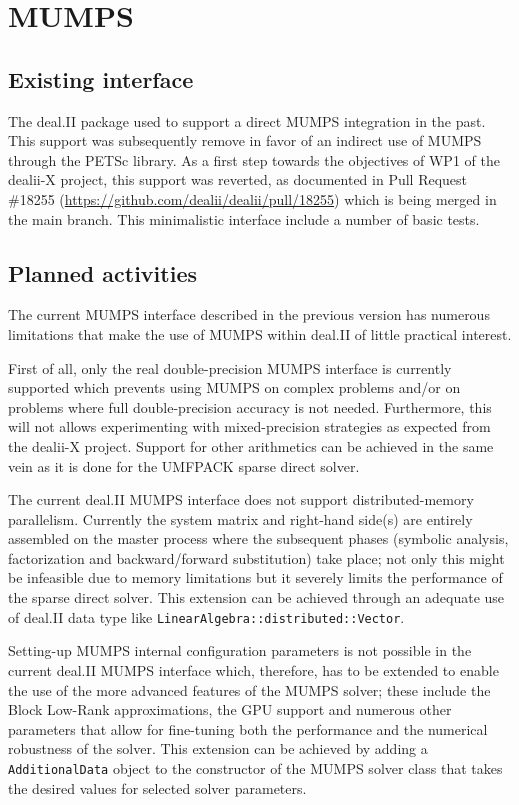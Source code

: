 \documentclass[a4paper,12pt]{article}
\begin{document}
\newpage

\section{MUMPS}
\label{sec:section2}

\subsection{Existing interface}

The deal.II package used to support a direct MUMPS integration in the
past. This support was subsequently remove in favor of an indirect use
of MUMPS through the PETSc library. As a first step towards the
objectives of WP1 of the dealii-X project, this support was reverted,
as documented in Pull Request \#18255
(\url{https://github.com/dealii/dealii/pull/18255}) which is being
merged in the main branch. This minimalistic interface include a
number of basic tests.


\subsection{Planned activities}

The current MUMPS interface described in the previous version has
numerous limitations that make the use of MUMPS within deal.II of
little practical interest.

First of all, only the real double-precision MUMPS interface is
currently supported which prevents using MUMPS on complex problems
and/or on problems where full double-precision accuracy is not
needed. Furthermore, this will not allows experimenting with
mixed-precision strategies as expected from the dealii-X
project. Support for other arithmetics can be achieved in the same
vein as it is done for the UMFPACK sparse direct solver.

The current deal.II MUMPS interface does not support
distributed-memory parallelism. Currently the system matrix and
right-hand side(s) are entirely assembled on the master process where
the subsequent phases (symbolic analysis, factorization and
backward/forward substitution) take place; not
only this might be infeasible due to memory limitations but it
severely limits the performance of the sparse direct solver. This
extension can be achieved through an adequate use of deal.II data type
like \texttt{LinearAlgebra::distributed::Vector}.

Setting-up MUMPS internal configuration parameters is not possible in
the current deal.II MUMPS interface which, therefore, has to be
extended to enable the use of the more advanced features of the MUMPS
solver; these include the Block Low-Rank approximations, the GPU
support and numerous other parameters that allow for fine-tuning both
the performance and the numerical robustness of the solver. This
extension can be achieved by adding a \texttt{AdditionalData} object
to the constructor of the MUMPS solver class that takes the desired
values for selected solver parameters.
\end{document}
